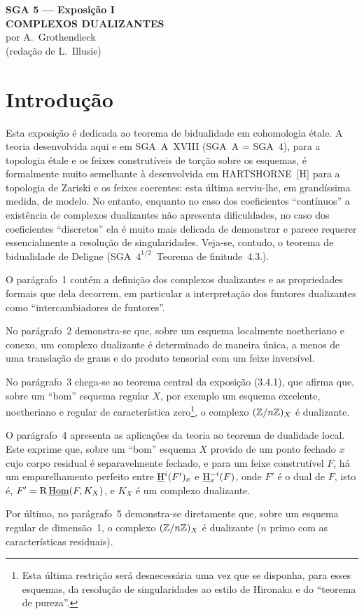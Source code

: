 \begin{center}
{\Large \textbf{SGA 5 --- Exposição I}}\\[0.4em]
{\large \textbf{COMPLEXOS DUALIZANTES}}\\[0.3em]
por A.~Grothendieck\\
(redação de L.~Illusie)
\end{center}

\section*{Introdução}

Esta exposição é dedicada ao teorema de bidualidade em cohomologia étale. A teoria desenvolvida aqui e em SGA~A~XVIII (SGA~A = SGA~4), para a topologia étale e os feixes construtíveis de torção sobre os esquemas, é formalmente muito semelhante à desenvolvida em HARTSHORNE~[H] para a topologia de Zariski e os feixes coerentes: esta última serviu-lhe, em grandíssima medida, de modelo. No entanto, enquanto no caso dos coeficientes ``contínuos'' a existência de complexos dualizantes não apresenta dificuldades, no caso dos coeficientes ``discretos'' ela é muito mais delicada de demonstrar e parece requerer essencialmente a resolução de singularidades. Veja-se, contudo, o teorema de bidualidade de Deligne (SGA~$4^{1/2}$~Teorema de finitude~4.3.).

O parágrafo~1 contém a definição dos complexos dualizantes e as propriedades formais que dela decorrem, em particular a interpretação dos funtores dualizantes como ``intercambiadores de funtores''.

No parágrafo~2 demonstra-se que, sobre um esquema localmente noetheriano e conexo, um complexo dualizante é determinado de maneira única, a menos de uma translação de graus e do produto tensorial com um feixe inversível.

No parágrafo~3 chega-se ao teorema central da exposição (3.4.1), que afirma que, sobre um ``bom'' esquema regular $X$, por exemplo um esquema excelente, noetheriano e regular de característica zero\footnote{Esta última restrição será desnecessária uma vez que se disponha, para esses esquemas, da resolução de singularidades ao estilo de Hironaka e do ``teorema de pureza''.}, o complexo $(\mathbb{Z}/n\mathbb{Z})_X$ é dualizante.

O parágrafo~4 apresenta as aplicações da teoria ao teorema de dualidade local. Este exprime que, sobre um ``bom'' esquema $X$ provido de um ponto fechado $x$ cujo corpo residual é separavelmente fechado, e para um feixe construtível $F$, há um emparelhamento perfeito entre $\underline{\mathrm{H}}^i(F')_x$ e $\underline{\mathrm{H}}^{-i}_x(F)$, onde $F'$ é o dual de $F$, isto é, $F' = \mathrm{R}\,\underline{\operatorname{Hom}}(F,K_X)$, e $K_X$ é um complexo dualizante.

Por último, no parágrafo~5 demonstra-se diretamente que, sobre um esquema regular de dimensão~1, o complexo $(\mathbb{Z}/n\mathbb{Z})_X$ é dualizante ($n$ primo com as características residuais).
